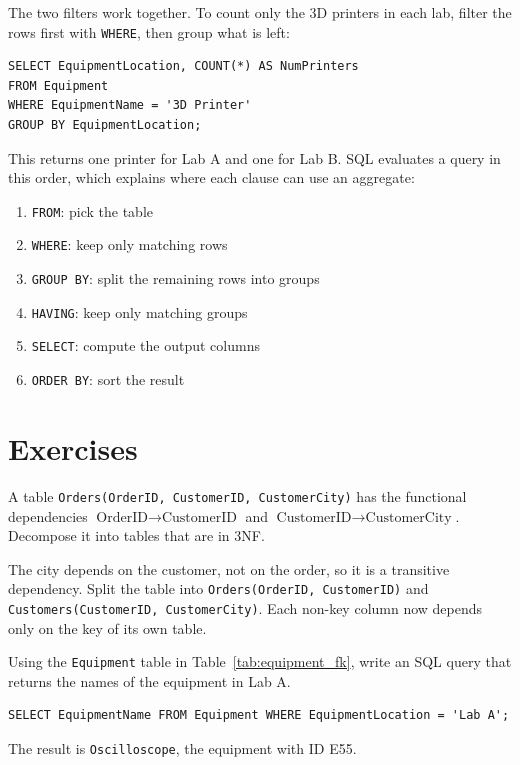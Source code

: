 The two filters work together. To count only the 3D printers in each lab, filter the rows first with \texttt{WHERE}, then group what is left:
\begin{verbatim}
SELECT EquipmentLocation, COUNT(*) AS NumPrinters
FROM Equipment
WHERE EquipmentName = '3D Printer'
GROUP BY EquipmentLocation;
\end{verbatim}
This returns one printer for Lab A and one for Lab B. SQL evaluates a query in this order, which explains where each clause can use an aggregate:
\begin{enumerate}
    \item \texttt{FROM}: pick the table
    \item \texttt{WHERE}: keep only matching rows
    \item \texttt{GROUP BY}: split the remaining rows into groups
    \item \texttt{HAVING}: keep only matching groups
    \item \texttt{SELECT}: compute the output columns
    \item \texttt{ORDER BY}: sort the result
\end{enumerate}

\section{Exercises}
\begin{Exercise}[title={Normalize to 3NF}, label=sql2_3nf]
A table \texttt{Orders(OrderID, CustomerID, CustomerCity)} has the functional dependencies $\text{OrderID} \to \text{CustomerID}$ and $\text{CustomerID} \to \text{CustomerCity}$. Decompose it into tables that are in 3NF.
\end{Exercise}
\begin{Answer}[ref=sql2_3nf]
The city depends on the customer, not on the order, so it is a transitive dependency. Split the table into \texttt{Orders(OrderID, CustomerID)} and \texttt{Customers(CustomerID, CustomerCity)}. Each non-key column now depends only on the key of its own table.
\end{Answer}

\begin{Exercise}[title={Translate to SQL}, label=sql2_translate]
Using the \texttt{Equipment} table in Table~\ref{tab:equipment_fk}, write an SQL query that returns the names of the equipment in Lab A.
\end{Exercise}
\begin{Answer}[ref=sql2_translate]
\begin{verbatim}
SELECT EquipmentName FROM Equipment WHERE EquipmentLocation = 'Lab A';
\end{verbatim}
The result is \texttt{Oscilloscope}, the equipment with ID E55.
\end{Answer}